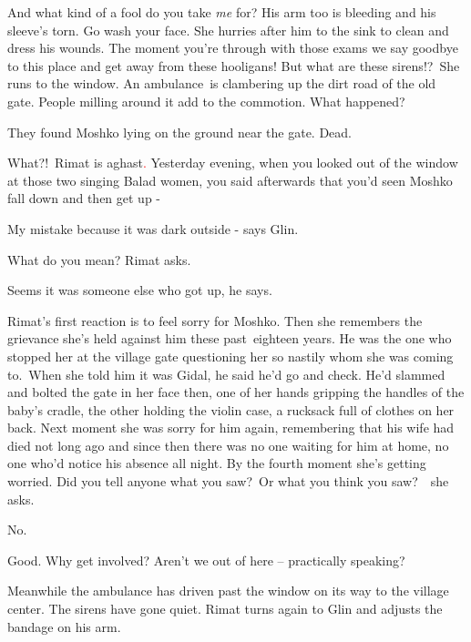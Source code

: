\documentclass[letterpaper]{article}
\begin{document}
{\textquotedbl}And what kind of a fool do you take \textit{me} for?{\textquotedbl} His arm too is bleeding and his
sleeve's torn. {\textquotedbl}Go wash your face.{\textquotedbl} She hurries after him to the sink to clean and dress
his wounds. {\textquotedbl}The moment you're through with those exams we say goodbye to this place and get away from
these hooligans! But what are these sirens!?{\textquotedbl}\ She runs to the window. An ambulance~is clambering up the
dirt road of the old gate. People milling around it add to the commotion. {\textquotedbl}What happened?{\textquotedbl}

{\textquotedbl}They found Moshko lying on the ground near the gate. Dead.{\textquotedbl} 

{\textquotedbl}What?!\ {\textquotedbl}Rimat is aghast\textcolor{red}{. }{\textquotedbl}Yesterday evening, when you
looked out of the window at those two singing Balad women, you said afterwards that you'd seen Moshko fall down and
then get up -{\textquotedbl} 

{\textquotedbl}My mistake because it was dark outside -{\textquotedbl} says Glin.

{\textquotedbl}What do you mean?{\textquotedbl} Rimat asks. 

{\textquotedbl}Seems it was someone else who got up,{\textquotedbl} he says. 

Rimat's first reaction is to feel sorry for Moshko. Then she remembers the grievance she's held against him these
past\textcolor{red}{\ }eighteen years. He was the one who stopped her at the village gate questioning her so nastily
whom she was coming to.\ When she told him it was Gidal, he said he'd go and check. He'd slammed and bolted the gate in
her face then, one of her hands gripping the handles of the baby's cradle, the other holding the violin case, a
rucksack full of clothes on her back. Next moment she was sorry for him again, remembering that  his wife had died not
long ago and since then there was no one waiting for him at home, no one who'd notice his absence all night. By the
fourth moment she's getting worried. {\textquotedbl}Did you tell anyone what you saw?\ Or what you think you
saw?{\textquotedbl}\ \ she asks.

{\textquotedbl}No.{\textquotedbl}

{\textquotedbl}Good. Why get involved? Aren't we out of here -- practically speaking?{\textquotedbl} 

Meanwhile the ambulance has driven past the window on its way to the village center. The sirens have gone quiet. Rimat
turns again to Glin and adjusts the bandage on his arm.
\end{document}
